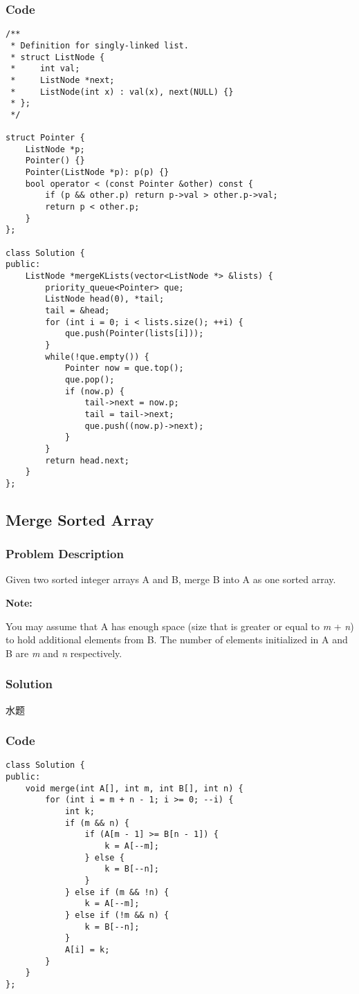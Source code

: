\documentclass[courier]{article}
\begin{document}
\begin{CJK*}{UTF8}{gkai}
\subsubsection*{Code}
\begin{lstlisting}
/**
 * Definition for singly-linked list.
 * struct ListNode {
 *     int val;
 *     ListNode *next;
 *     ListNode(int x) : val(x), next(NULL) {}
 * };
 */
 
struct Pointer {
    ListNode *p;
    Pointer() {}
    Pointer(ListNode *p): p(p) {} 
    bool operator < (const Pointer &other) const {
        if (p && other.p) return p->val > other.p->val;
        return p < other.p;
    }
};

class Solution {
public:
    ListNode *mergeKLists(vector<ListNode *> &lists) {
        priority_queue<Pointer> que;
        ListNode head(0), *tail;
        tail = &head;
        for (int i = 0; i < lists.size(); ++i) {
            que.push(Pointer(lists[i]));
        }
        while(!que.empty()) {
            Pointer now = que.top();
            que.pop();
            if (now.p) {
                tail->next = now.p;
                tail = tail->next;
                que.push((now.p)->next);
            }
        }
        return head.next;
    }
}; 
\end{lstlisting}


\subsection{ Merge Sorted Array }

\subsubsection*{Problem Description}
Given two sorted integer arrays A and B, merge B into A as one sorted array.

\textbf{Note:}


You may assume that A has enough space (size that is greater or equal to \emph{m} + \emph{n}) to hold additional elements from B. The number of elements initialized in A and B are \emph{m} and \emph{n} respectively.



\subsubsection*{Solution}
水题

\subsubsection*{Code}
\begin{lstlisting}
class Solution {
public:
    void merge(int A[], int m, int B[], int n) {
        for (int i = m + n - 1; i >= 0; --i) {
            int k;
            if (m && n) {
                if (A[m - 1] >= B[n - 1]) {
                    k = A[--m];
                } else {
                    k = B[--n];
                }
            } else if (m && !n) {
                k = A[--m];
            } else if (!m && n) {
                k = B[--n];
            }
            A[i] = k;
        }
    }
}; 
\end{lstlisting}



\end{CJK*}
\end{document}
